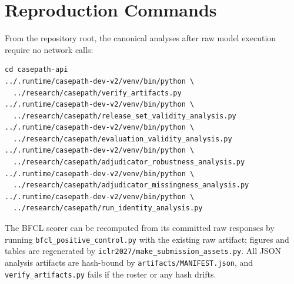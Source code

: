 \documentclass{article}
\begin{document}
\section{Reproduction Commands}
\label{app:repro}
From the repository root, the canonical analyses after raw model execution require no network calls:
\begin{verbatim}
cd casepath-api
../.runtime/casepath-dev-v2/venv/bin/python \
  ../research/casepath/verify_artifacts.py
../.runtime/casepath-dev-v2/venv/bin/python \
  ../research/casepath/release_set_validity_analysis.py
../.runtime/casepath-dev-v2/venv/bin/python \
  ../research/casepath/evaluation_validity_analysis.py
../.runtime/casepath-dev-v2/venv/bin/python \
  ../research/casepath/adjudicator_robustness_analysis.py
../.runtime/casepath-dev-v2/venv/bin/python \
  ../research/casepath/adjudicator_missingness_analysis.py
../.runtime/casepath-dev-v2/venv/bin/python \
  ../research/casepath/run_identity_analysis.py
\end{verbatim}
The BFCL scorer can be recomputed from its committed raw responses by running \texttt{bfcl\_positive\_control.py} with the existing raw artifact; figures and tables are regenerated by \texttt{iclr2027/make\_submission\_assets.py}. All JSON analysis artifacts are hash-bound by \texttt{artifacts/MANIFEST.json}, and \texttt{verify\_artifacts.py} fails if the roster or any hash drifts.
\end{document}
